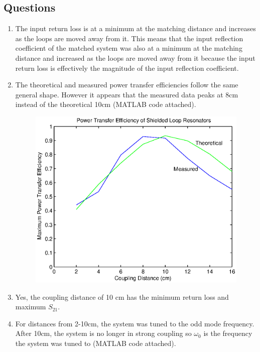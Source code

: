 \documentclass{article}
\begin{document}
\subsection{Questions}

\begin{enumerate}
	\item The input return loss is at a minimum at the matching distance and increases as the loops are moved away from it. This means that the input reflection coefficient of the matched system was also at a minimum at the matching distance and increased as the loops are moved away from it because the input return loss is effectively the magnitude of the input reflection coefficient.
	\item The theoretical and measured power transfer efficiencies follow the same general shape. However it appears that the measured data peaks at 8cm instead of the theoretical 10cm (MATLAB code attached).
	\begin{figure}[H]
		\centering
   		\includegraphics[scale = 0.85]{./Matlab/Question2_2.eps}
	\end{figure}
	\item Yes, the coupling distance of 10 cm has the minimum return loss and maximum $S_{21}$.
	\item For distances from 2-10cm, the system was tuned to the odd mode frequency. After 10cm, the system is no longer in strong coupling so $\omega_0$ is the frequency the system was tuned to (MATLAB code attached).
	\begin{figure}[H]

\end{figure}
\end{enumerate}
\end{document}
